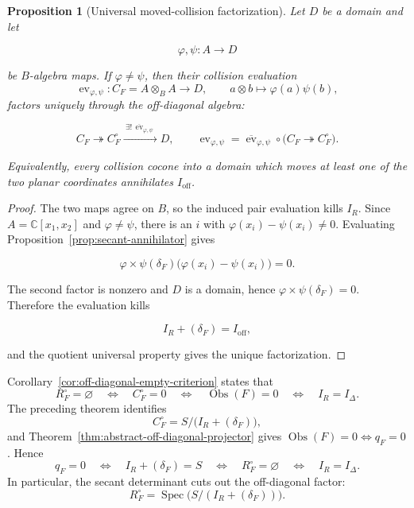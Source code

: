 \documentclass[11pt]{article}
\newtheorem{proposition}[theorem]{Proposition}
\theoremstyle{remark}
\theoremstyle{definition}
\DeclareMathOperator{\Spec}{Spec}
\newcommand{\C}{\mathbb C}
\newcommand{\Obs}{\operatorname{Obs}}
\begin{document}
\begin{proposition}[Universal moved-collision factorization]
\label{prop:universal-moved-collision-factorization}
Let \(D\) be a domain and let

\[
  \varphi,\psi:A\longrightarrow D
\]

be \(B\)-algebra maps.  If \(\varphi\ne\psi\), then their collision
evaluation
\[
  \operatorname{ev}_{\varphi,\psi}:C_F=A\otimes_BA\longrightarrow D,
  \qquad a\otimes b\longmapsto\varphi(a)\psi(b),
\]
factors uniquely through the off-diagonal algebra:

\[
  C_F\twoheadrightarrow C_F^\circ
  \xrightarrow{\ \exists!\,\overline{\operatorname{ev}}_{\varphi,\psi}\ }D,
  \qquad
  \operatorname{ev}_{\varphi,\psi}
  =\overline{\operatorname{ev}}_{\varphi,\psi}\circ
    \bigl(C_F\twoheadrightarrow C_F^\circ\bigr).
\]

Equivalently, every collision cocone into a domain which moves at least one
of the two planar coordinates annihilates \(I_{\mathrm{off}}\).
\end{proposition}

\begin{proof}
The two maps agree on \(B\), so the induced pair evaluation kills \(I_R\).
Since \(A=\C[x_1,x_2]\) and \(\varphi\ne\psi\), there is an \(i\) with
\(\varphi(x_i)-\psi(x_i)\ne0\).  Evaluating
Proposition~\ref{prop:secant-annihilator} gives

\[
  \varphi\!\times\!\psi(\delta_F)
  \bigl(\varphi(x_i)-\psi(x_i)\bigr)=0.
\]

The second factor is nonzero and \(D\) is a domain, hence
\(\varphi\!\times\!\psi(\delta_F)=0\).  Therefore the evaluation kills

\[
  I_R+(\delta_F)=I_{\mathrm{off}},
\]

and the quotient universal property gives the unique factorization.
\end{proof}

Corollary~\ref{cor:off-diagonal-empty-criterion} states that
\[
  R_F^\circ=\varnothing
  \quad\Longleftrightarrow\quad
  C_F^\circ=0
  \quad\Longleftrightarrow\quad
  \Obs(F)=0
  \quad\Longleftrightarrow\quad
  I_R=I_\Delta.
\]
The preceding theorem identifies
\[
  C_F^\circ
  =
  S\big/\bigl(I_R+(\delta_F)\bigr),
\]
and Theorem~\ref{thm:abstract-off-diagonal-projector} gives
\(\Obs(F)=0\Longleftrightarrow q_F=0\).  Hence
\[
  q_F=0
  \quad\Longleftrightarrow\quad
  I_R+(\delta_F)=S
  \quad\Longleftrightarrow\quad
  R_F^\circ=\varnothing
  \quad\Longleftrightarrow\quad
  I_R=I_\Delta.
\]
In particular, the secant determinant cuts out the off-diagonal factor:
\[
  R_F^\circ
  =
  \Spec\!\bigl(S/(I_R+(\delta_F))\bigr).
\]
\end{document}
